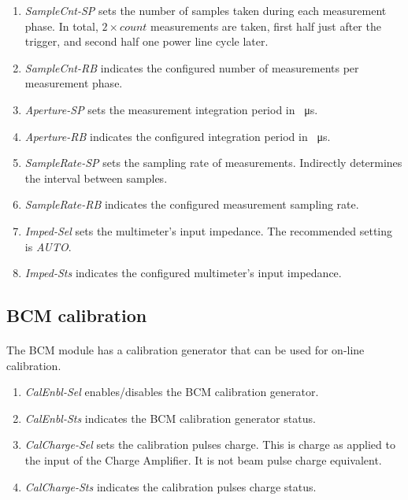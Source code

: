 \documentclass[openany]{article}
\begin{document}
			\begin{enumerate}
				\item \emph{SampleCnt-SP} sets the number of samples taken during each measurement phase. In total, $ 2\times count $ measurements are taken, first half just after the trigger, and second half one power line cycle later.
				\item \emph{SampleCnt-RB} indicates the configured number of measurements per measurement phase.
				\item \emph{Aperture-SP} sets the measurement integration period in \SI{}{\micro\second}.
				\item \emph{Aperture-RB} indicates the configured integration period in \SI{}{\micro\second}.
				\item \emph{SampleRate-SP} sets the sampling rate of measurements. Indirectly determines the interval between samples.
				\item \emph{SampleRate-RB} indicates the configured measurement sampling rate.
				\item \emph{Imped-Sel} sets the multimeter's input impedance. The recommended setting is \emph{AUTO}.
				\item \emph{Imped-Sts} indicates the configured multimeter's input impedance.
			\end{enumerate}

	\subsection{BCM calibration}

		\paragraph{} The BCM module has a calibration generator that can be used for on-line calibration.

			\begin{enumerate}
				\item \emph{CalEnbl-Sel} enables/disables the BCM calibration generator.
				\item \emph{CalEnbl-Sts} indicates the BCM calibration generator status.
				\item \emph{CalCharge-Sel} sets the calibration pulses charge. This is charge as applied to the input of the Charge Amplifier. It is not beam pulse charge equivalent.
				\item \emph{CalCharge-Sts} indicates the calibration pulses charge status.
			\end{enumerate}
\end{document}
